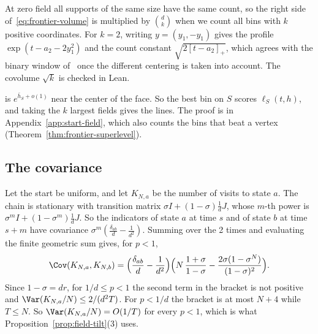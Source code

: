 At zero field all supports of the same size have the same count, so the right
side of~\eqref{eq:frontier-volume} is multiplied by $\binom dk$ when we count all
bins with $k$ positive coordinates. For $k=2$, writing $y=(y_1,-y_1)$ gives the
profile $\exp(t-a_2-2y_1^2)$ and the count constant $\sqrt{2[t-a_2]_+}$, which
agrees with the binary window of~\cite{paperA} once the different centering is
taken into account. The covolume $\sqrt k$ is checked in Lean.

is $e^{\bar h_S+o(1)}$ near the center of the face. So the best bin on $S$
scores $\ell_S(t,h)$, and taking the $k$ largest fields gives the lines. The
proof is in Appendix~\ref{app:start-field}, which also counts the bins that
beat a vertex (Theorem~\ref{thm:frontier-superlevel}).

\subsection{The covariance}

\begin{remark}\label{rem:tetra}
Let the start be uniform, and let $K_{N,a}$ be the number of visits to state
$a$. The chain is stationary with transition matrix $\sigma I+(1-\sigma)\frac1dJ$,
whose $m$-th power is $\sigma^mI+(1-\sigma^m)\frac1dJ$. So the indicators of
state $a$ at time $s$ and of state $b$ at time $s+m$ have covariance
$\sigma^m(\frac{\delta_{ab}}d-\frac1{d^2})$. Summing over the 2 times and
evaluating the finite geometric sum gives, for $p<1$,
\[
 \Cov(K_{N,a},K_{N,b})=\Bigl(\frac{\delta_{ab}}d-\frac1{d^2}\Bigr)
 \Bigl(N\,\frac{1+\sigma}{1-\sigma}-\frac{2\sigma(1-\sigma^N)}{(1-\sigma)^2}\Bigr).
\]
Since $1-\sigma=dr$, for $1/d\le p<1$ the second term in the bracket is not
positive and $\Var(K_{N,a}/N)\le2/(d^2T)$. For $p<1/d$ the bracket is at most
$N+4$ while $T\le N$. So $\Var(K_{N,a}/N)=O(1/T)$ for every $p<1$, which is
what Proposition~\ref{prop:field-tilt}(3) uses.
\end{remark}

